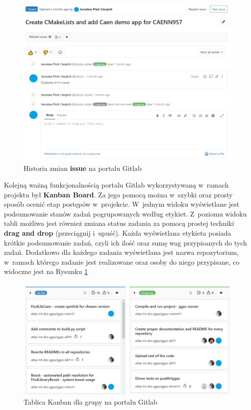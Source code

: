 \begin{figure}[H]
\centering
\caption{Historia zmian \textbf{issue} na portalu Gitlab}
\includegraphics[width=\textwidth]{res/png/issueOngoing}
\end{figure}

\newpage

Kolejną ważną funkcjonalnością portalu Gitlab wykorzystywaną w~ramach projektu był \textbf{Kanban Board}. Za jego pomocą można w~szybki oraz prosty sposób ocenić etap postępów w~projekcie. W~jednym widoku wyświetlane jest podsumowanie stanów zadań pogrupowanych według etykiet. Z~poziomu widoku tabli możliwa jest również zmiana status zadania za pomocą prostej techniki \textbf{drag and drop} (przeciągnij i~upuść). Każda wyświetlana etykieta posiada krótkie podsumowanie zadań, czyli ich ilość oraz sumę wag przypisanych do tych zadań. Dodatkowo dla każdego zadania wyświetlana jest nazwa repozytorium, w~ramach którego zadanie jest realizowane oraz osoby do niego przypisane, co widoczne jest na Rysunku \ref{fig:kanban}

\begin{figure}[H]
\centering
\caption{Tablica Kanban dla grupy na portalu Gitlab}
\label{fig:kanban}
\includegraphics[width=\textwidth]{res/png/kanban}
\end{figure}

